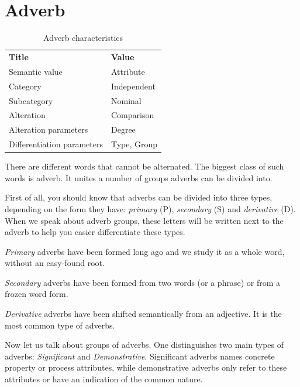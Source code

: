 \section{Adverb}

\begin{table}[h]
	\caption{Adverb characteristics}
	\begin{tabular}{ll}
		\textbf{Title}              & \textbf{Value}      \\
		Semantic value              & Attribute           \\
		Category                    & Independent         \\
		Subcategory                 & Nominal             \\
		Alteration                  & Comparison          \\
		Alteration parameters       & Degree              \\
		Differentiation parameters  & Type, Group
	\end{tabular}
\end{table}

There are different words that cannot be alternated. The biggest class of such words is adverb. It unites a number of groups adverbs can be divided into.

First of all, you should know that adverbs can be divided into three types, depending on the form they have: \textit{primary} (P), \textit{secondary} (S) and \textit{derivative} (D). When we speak about adverb groups, these letters will be written next to the adverb to help you easier differentiate these types.

\textit{Primary} adverbs have been formed long ago and we study it as a whole word, without an easy-found root.

\textit{Secondary} adverbs have been formed from two words (or a phrase) or from a frozen word form. 

\textit{Derivative} adverbs have been shifted semantically from an adjective. It is the most common type of adverbs.

Now let us talk about groups of adverbs. One distinguishes two main types of adverbs: \textit{Significant} and \textit{Demonstrative}. Significant adverbs names concrete property or process attributes, while demonstrative adverbs only refer to these attributes or have an indication of the common nature.

